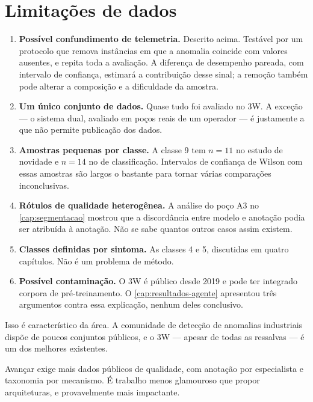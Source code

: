 \section{Limitações de dados}

\begin{enumerate}[leftmargin=*,itemsep=0.4em]

\item \textbf{Possível confundimento de telemetria.} Descrito acima. Testável por um protocolo
que remova instâncias em que a anomalia coincide com valores ausentes, e repita toda a
avaliação. A diferença de desempenho pareada, com intervalo de confiança, estimará a
contribuição desse sinal; a remoção também pode alterar a composição e a dificuldade da
amostra.

\item \textbf{Um único conjunto de dados.} Quase tudo foi avaliado no 3W. A exceção ---
o sistema dual, avaliado em poços reais de um operador --- é justamente a que não permite
publicação dos dados.

\item \textbf{Amostras pequenas por classe.} A classe 9 tem $n = 11$ no estudo de
novidade e $n = 14$ no de classificação. Intervalos de confiança de Wilson com essas
amostras são largos o bastante para tornar várias comparações inconclusivas.

\item \textbf{Rótulos de qualidade heterogênea.} A análise do poço A3 no
\cref{cap:segmentacao} mostrou que a discordância entre modelo e anotação podia ser
atribuída à anotação. Não se sabe quantos outros casos assim existem.

\item \textbf{Classes definidas por sintoma.} As classes 4 e 5, discutidas em quatro
capítulos. Não é um problema de método.

\item \textbf{Possível contaminação.} O 3W é público desde 2019 e pode ter integrado
corpora de pré-treinamento. O \cref{cap:resultados-agente} apresentou três argumentos
contra essa explicação, nenhum deles conclusivo.

\end{enumerate}

\begin{destaque}
Isso é característico da área. A comunidade de detecção de anomalias industriais dispõe
de poucos conjuntos públicos, e o 3W --- apesar de todas as ressalvas --- é um dos
melhores existentes.

Avançar exige mais dados públicos de qualidade, com anotação por especialista e taxonomia
por mecanismo. É trabalho menos glamouroso que propor arquiteturas, e provavelmente mais
impactante.
\end{destaque}

